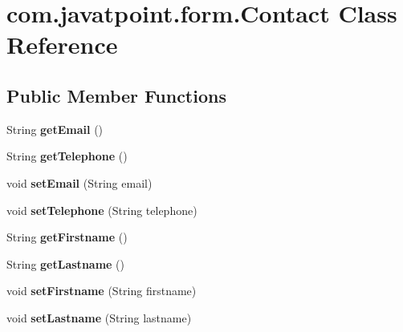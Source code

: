 \hypertarget{classcom_1_1javatpoint_1_1form_1_1_contact}{}\section{com.\+javatpoint.\+form.\+Contact Class Reference}
\label{classcom_1_1javatpoint_1_1form_1_1_contact}
\subsection*{Public Member Functions}
\begin{DoxyCompactItemize}
\item 
\mbox{\label{classcom_1_1javatpoint_1_1form_1_1_contact_a7b59e57a52a290e637207bdd9e49b828}} 
String {\bfseries get\+Email} ()
\item 
\mbox{\label{classcom_1_1javatpoint_1_1form_1_1_contact_ac1ab7b1aa4c5bc0455ce3b1b7c933a60}} 
String {\bfseries get\+Telephone} ()
\item 
\mbox{\label{classcom_1_1javatpoint_1_1form_1_1_contact_a6fa8f8e0436d474c69b3c30eba28007a}} 
void {\bfseries set\+Email} (String email)
\item 
\mbox{\label{classcom_1_1javatpoint_1_1form_1_1_contact_a0096e67cb81a8ab3d5280732961ea4aa}} 
void {\bfseries set\+Telephone} (String telephone)
\item 
\mbox{\label{classcom_1_1javatpoint_1_1form_1_1_contact_a4b07e12a5394739277757f57fdf1c9e1}} 
String {\bfseries get\+Firstname} ()
\item 
\mbox{\label{classcom_1_1javatpoint_1_1form_1_1_contact_a4e0f1553dd66c0781e57f32bc531d5c5}} 
String {\bfseries get\+Lastname} ()
\item 
\mbox{\label{classcom_1_1javatpoint_1_1form_1_1_contact_a8c4dd92f8f799ea22b7067a967af4cbf}} 
void {\bfseries set\+Firstname} (String firstname)
\item 
\mbox{\label{classcom_1_1javatpoint_1_1form_1_1_contact_a8478357e67c2ec7b2b030342b2ac99b0}} 
void {\bfseries set\+Lastname} (String lastname)
\end{DoxyCompactItemize}


